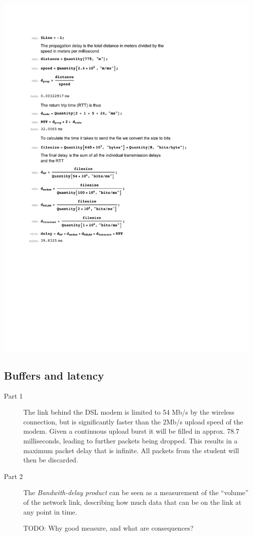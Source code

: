\documentclass[a4paper]{article}
\begin{document}
\includegraphics{../calc2.pdf}

\subsection{Buffers and latency}
\begin{description}
    \item[Part 1] The link behind the DSL modem is limited to 54 Mb/s by the
        wireless connection, but is significantly faster than the 2Mb/s upload
        speed of the modem. Given a continuous upload burst it will be filled
        in approx. 78.7 milliseconds, leading to further packets being dropped.
        This results in a maximum packet delay that is infinite. All packets
        from the student will then be discarded.
    \item[Part 2] The \emph{Bandwith-delay product} can be seen as a
        measurement of the ``volume'' of the network link, describing how much
        data that can be on the link at any point in time.
        
        TODO: Why good measure, and what are consequences?
\end{description}
\end{document}
